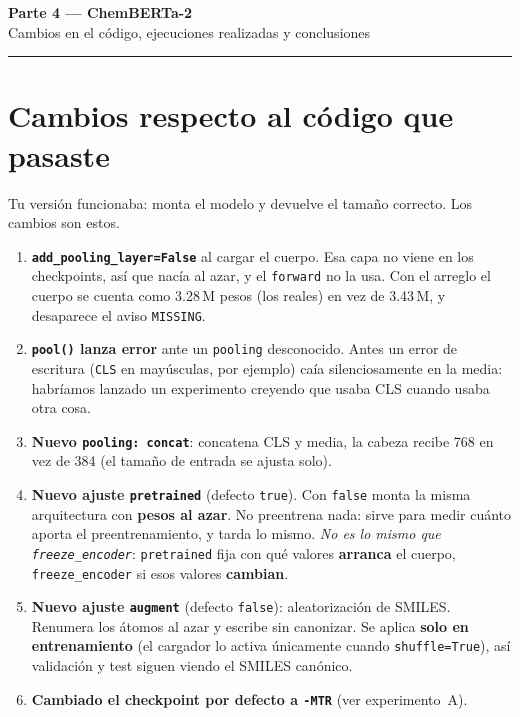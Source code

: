 \documentclass[11pt,a4paper]{article}
\newcommand{\var}[1]{\texttt{#1}}
\begin{document}
\begin{center}
{\LARGE\bfseries Parte 4 --- ChemBERTa-2}\\[4pt]
{\large Cambios en el código, ejecuciones realizadas y conclusiones}
\end{center}
\vspace{6pt}\hrule\vspace{10pt}

\section{Cambios respecto al código que pasaste}

Tu versión funcionaba: monta el modelo y devuelve el tamaño correcto. Los cambios son estos.

\begin{enumerate}
  \item \textbf{\var{add\_pooling\_layer=False}} al cargar el cuerpo. Esa capa no viene en los
        checkpoints, así que nacía al azar, y el \var{forward} no la usa. Con el arreglo el cuerpo se
        cuenta como 3.28\,M pesos (los reales) en vez de 3.43\,M, y desaparece el aviso \var{MISSING}.
  \item \textbf{\var{pool()} lanza error} ante un \var{pooling} desconocido. Antes un error de
        escritura (\var{CLS} en mayúsculas, por ejemplo) caía silenciosamente en la media: habríamos
        lanzado un experimento creyendo que usaba CLS cuando usaba otra cosa.
  \item \textbf{Nuevo \var{pooling: concat}}: concatena CLS y media, la cabeza recibe 768 en vez de
        384 (el tamaño de entrada se ajusta solo).
  \item \textbf{Nuevo ajuste \var{pretrained}} (defecto \var{true}). Con \var{false} monta la misma
        arquitectura con \textbf{pesos al azar}. No preentrena nada: sirve para medir cuánto aporta
        el preentrenamiento, y tarda lo mismo.
        \emph{No es lo mismo que \var{freeze\_encoder}}: \var{pretrained} fija con qué valores
        \textbf{arranca} el cuerpo, \var{freeze\_encoder} si esos valores \textbf{cambian}.
  \item \textbf{Nuevo ajuste \var{augment}} (defecto \var{false}): aleatorización de SMILES. Renumera
        los átomos al azar y escribe sin canonizar. Se aplica \textbf{solo en entrenamiento} (el
        cargador lo activa únicamente cuando \var{shuffle=True}), así validación y test siguen viendo
        el SMILES canónico.
  \item \textbf{Cambiado el checkpoint por defecto a \var{-MTR}} (ver experimento~A).
\end{enumerate}
\end{document}
